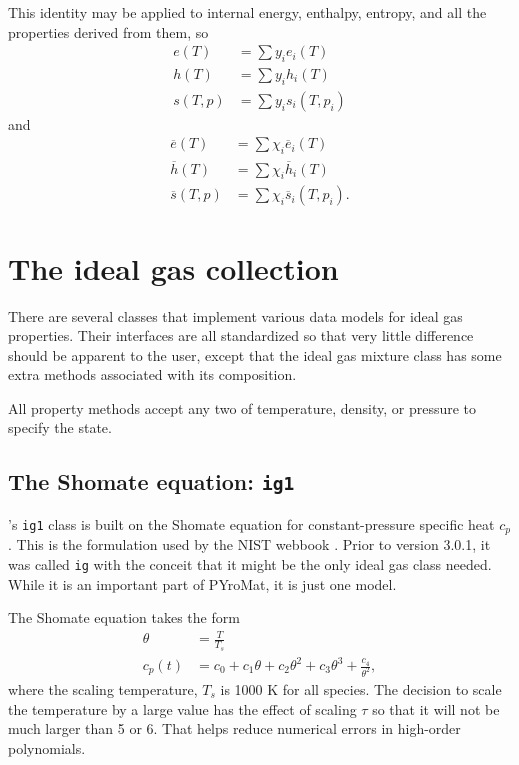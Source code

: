 This identity may be applied to internal energy, enthalpy, entropy, and all the properties derived from them, so
\begin{subequations}
\begin{align}
e(T) &= \sum y_i e_i(T)\\
h(T) &= \sum y_i h_i(T)\\
s(T,p) &= \sum y_i s_i(T,p_i)
\end{align}
\end{subequations}
and
\begin{subequations}
\begin{align}
\overline{e}(T) &= \sum \chi_i \overline{e}_i(T)\\
\overline{h}(T) &= \sum \chi_i \overline{h}_i(T)\\
\overline{s}(T,p) &= \sum \chi_i \overline{s}_i(T,p_i).
\end{align}
\end{subequations}


\section{The ideal gas collection}

There are several classes that implement various data models for ideal gas properties.  Their interfaces are all standardized so that very little difference should be apparent to the user, except that the ideal gas mixture class has some extra methods associated with its composition.

All property methods accept any two of temperature, density, or pressure to specify the state.

\subsection{The Shomate equation: \texttt{ig1}}\label{sec:ig:ig1}

\PM's \texttt{ig1} class is built on the Shomate equation for constant-pressure specific heat $c_p$.  This is the formulation used by the NIST webbook \cite{nist:webbook}.  Prior to version 3.0.1, it was called \texttt{ig} with the conceit that it might be the only ideal gas class needed.  While it is an important part of PYroMat, it is just one model.

The Shomate equation takes the form
\begin{align}
\theta &= \frac{T}{T_s}\\
c_p(t) &= c_0 + c_1 \theta + c_2 \theta^2 + c_3 \theta^3 + \frac{c_4}{\theta^2},
\end{align}
where the scaling temperature, $T_s$ is 1000 K for all species.  The decision to scale the temperature by a large value has the effect of scaling $\tau$ so that it will not be much larger than 5 or 6.  That helps reduce numerical errors in high-order polynomials.

